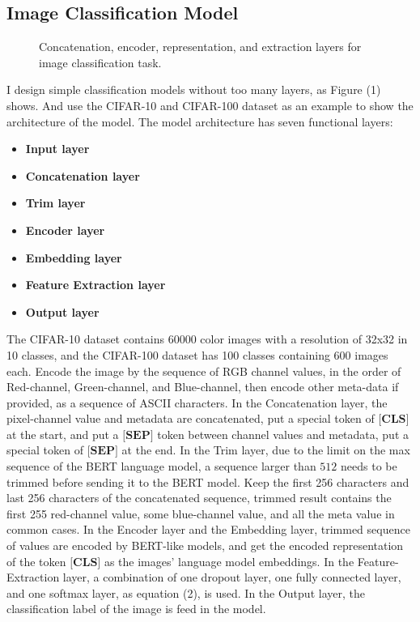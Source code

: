 \documentclass[review]{cvpr}
\begin{document}
\subsection{Image Classification Model}

\begin{figure*}
\begin{center}
\end{center}
   \caption{Concatenation, encoder, representation, and extraction layers for image classification task.}
\label{fig:short}
\end{figure*}

I design simple classification models without too many layers, as Figure (1) shows.
And use the CIFAR-10 and CIFAR-100 dataset as an example to show the architecture of the model.
The model architecture has seven functional layers:

\begin{itemize}
\item {\bf Input layer}
\item {\bf Concatenation layer}
\item {\bf Trim layer}
\item {\bf Encoder layer}
\item {\bf Embedding layer}
\item {\bf Feature Extraction layer}
\item {\bf Output layer}
\end{itemize}

\par The CIFAR-10 dataset contains 60000 color images with a resolution of 32x32 in 10 classes, and the CIFAR-100 dataset has 100 classes containing 600 images each.
Encode the image by the sequence of RGB channel values, in the order of Red-channel, Green-channel, and Blue-channel,
then encode other meta-data if provided, as a sequence of ASCII characters.
In the Concatenation layer, the pixel-channel value and metadata are concatenated, put a special token of $\textbf{[CLS]}$ at the start,
and put a $\textbf{[SEP]}$ token between channel values and metadata, put a special token of $\textbf{[SEP]}$ at the end.
In the Trim layer, due to the limit on the max sequence of the BERT language model, a sequence larger than $512$ needs to be trimmed before sending it to the BERT model.
Keep the first 256 characters and last 256 characters of the concatenated sequence, trimmed result contains the first 255 red-channel value,
some blue-channel value, and all the meta value in common cases.
In the Encoder layer and the Embedding layer, trimmed sequence of values are encoded by BERT-like models,
and get the encoded representation of the token $\textbf{[CLS]}$ as the images' language model embeddings.
In the Feature-Extraction layer, a combination of one dropout layer, one fully connected layer, and one softmax layer, as equation (2), is used.
In the Output layer, the classification label of the image is feed in the model.
\end{document}
